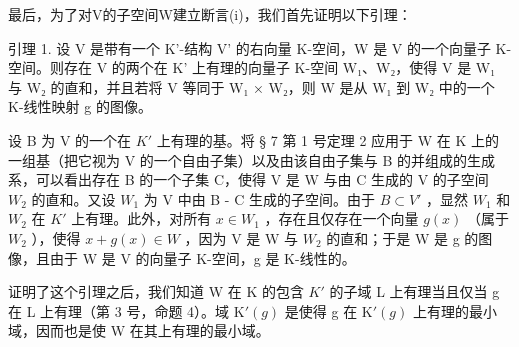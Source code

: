 最后，为了对V的子空间W建立断言(i)，我们首先证明以下引理：

引理 1. 设 V 是带有一个 K'-结构 V' 的右向量 K-空间，W 是 V 的一个向量子 K-空间。则存在 V 的两个在 K' 上有理的向量子 K-空间 W₁、W₂，使得 V 是 W₁ 与 W₂ 的直和，并且若将 V 等同于 W₁ × W₂，则 W 是从 W₁ 到 W₂ 中的一个 K-线性映射 g 的图像。

设 B 为 V 的一个在 \(K'\) 上有理的基。将 § 7 第 1 号定理 2 应用于 W 在 K 上的一组基（把它视为 V 的一个自由子集）以及由该自由子集与 B 的并组成的生成系，可以看出存在 B 的一个子集 C，使得 V 是 W 与由 C 生成的 V 的子空间 \(W_{2}\) 的直和。又设 \(W_{1}\) 为 V 中由 B - C 生成的子空间。由于 \(B \subset V'\) ，显然 \(W_{1}\) 和 \(W_{2}\) 在 \(K'\) 上有理。此外，对所有 \(x \in W_{1}\) ，存在且仅存在一个向量 \(g(x)\) （属于 \(W_{2}\) ），使得 \(x + g(x) \in W\) ，因为 V 是 W 与 \(W_{2}\) 的直和；于是 W 是 g 的图像，且由于 W 是 V 的向量子 K-空间，g 是 K-线性的。

证明了这个引理之后，我们知道 W 在 K 的包含 \(K'\) 的子域 L 上有理当且仅当 g 在 L 上有理（第 3 号，命题 4）。域 \(\mathrm{K}'(g)\) 是使得 g 在 \(\mathrm{K}'(g)\) 上有理的最小域，因而也是使 W 在其上有理的最小域。
\relax{}
